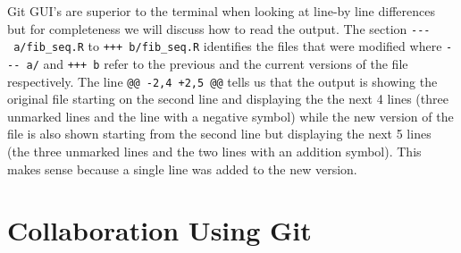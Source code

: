 \documentclass[
  letterpaper,
  DIV=11,
  numbers=noendperiod]{scrreprt}
\newenvironment{Shaded}{\begin{snugshade}}{\end{snugshade}}
\newcommand{\NormalTok}[1]{\textcolor[rgb]{0.00,0.23,0.31}{#1}}
\begin{document}
\begin{Shaded}
\end{Shaded}

Git GUI's are superior to the terminal when looking at line-by line
differences but for completeness we will discuss how to read the output.
The section \texttt{-\/-\/-\ a/fib\_seq.R} to \texttt{+++\ b/fib\_seq.R}
identifies the files that were modified where \texttt{-\/-\/-\ a/} and
\texttt{+++\ b} refer to the previous and the current versions of the
file respectively. The line \texttt{@@\ -2,4\ +2,5\ @@} tells us that
the output is showing the original file starting on the second line and
displaying the the next 4 lines (three unmarked lines and the line with
a negative symbol) while the new version of the file is also shown
starting from the second line but displaying the next 5 lines (the three
unmarked lines and the two lines with an addition symbol). This makes
sense because a single line was added to the new version.


\hypertarget{collaboration-using-git}{%
\chapter{Collaboration Using Git}\label{collaboration-using-git}}
\end{document}
